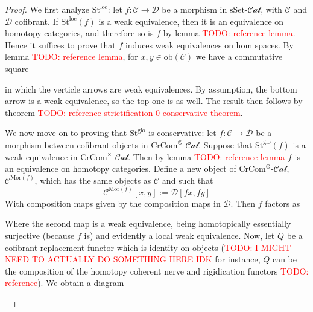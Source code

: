 \documentclass[12pt]{article}
\theoremstyle{definition}
\newcommand{\TODO}[1]{\textcolor{red}{TODO: {#1}}}
\newcommand{\C}{\mathcal{C}}
\newcommand{\D}{\mathcal{D}}
\newcommand{\crcom}{\text{CrCom}}
\newcommand{\cartcrossedcat}{\crcom^\times\text{-}\mathcal{Cat}}
\newcommand{\tensorcrossedcat}{\crcom^\otimes\text{-}\mathcal{Cat}}
\newcommand{\ssetcat}{\text{sSet}\text{-}\mathcal{Cat}}
\newcommand{\ob}{\text{ob}}
\newcommand{\st}{\text{St}}
\newcommand{\leftone}{\st^{\text{loc}}}
\newcommand{\lefttwo}{\st^{\text{glo}}}
\begin{document}
	\begin{proof}
		We first analyze $\leftone$: let $f: \C \to \D$ be a morphism in $\ssetcat$, with $\C$ and $\D$ cofibrant. 
		If $\leftone(f)$ is a weak equivalence, then it is an equivalence on homotopy categories, and therefore so is $f$ by lemma \TODO{reference lemma}. 
		Hence it suffices to prove that $f$ induces weak equivalences on hom spaces. By lemma \TODO{reference lemma}, for $x,y \in \ob(\C)$ we have a commutative square 
		\begin{center}
		\end{center}
		in which the verticle arrows are weak equivalences. 
		By assumption, the bottom arrow is a weak equivalence, so the top one is as well. 
		The result then follows by theorem \TODO{reference strictification 0 conservative theorem}.
		\\ \par 
		We now move on to proving that $\lefttwo$ is conservative: let $f: \C \to \D$ be a morphism between cofibrant objects in $\tensorcrossedcat$. 
		Suppose that $\lefttwo(f)$ is a weak equivalence in $\cartcrossedcat$. 
		Then by lemma \TODO{reference lemma} $f$ is an equivalence on homotopy categories.
		Define a new object of $\tensorcrossedcat$, $\C^{\text{Mor}(f)}$, which has the same objects as $\C$ and such that 
		$$\C^{\text{Mor}(f)}[x,y] := \D[fx,fy]$$
		With composition maps given by the composition maps in $\D$. Then $f$ factors as 
		\begin{center}
		\end{center}
		Where the second map is a weak equivalence, being homotopically essentially surjective (because $f$ is) and evidently a local weak equivalence. 
		Now, let $Q$ be a cofibrant replacement functor which is identity-on-objects (\TODO{I MIGHT NEED TO ACTUALLY DO SOMETHING HERE IDK} for instance, $Q$ can be the composition of the homotopy coherent nerve and rigidication functors \TODO{reference}). We obtain a diagram
		\begin{center}
\end{center}
\end{proof}
\end{document}
